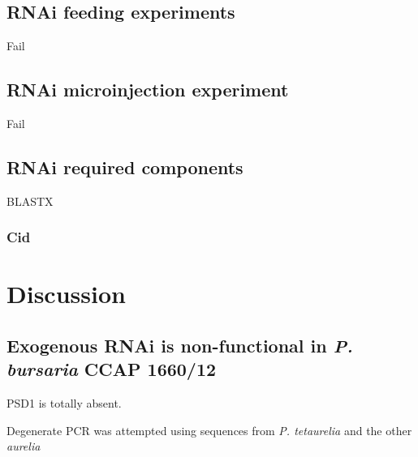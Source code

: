 \subsection{RNAi feeding experiments}

Fail

\subsection{RNAi microinjection experiment}

Fail

\subsection{RNAi required components}

BLASTX



\subsubsection{Cid}






\section{Discussion}

\subsection{Exogenous RNAi is non-functional in \textit{P. bursaria} CCAP 1660/12}

PSD1 is totally absent. 

Degenerate PCR was attempted using sequences from \textit{P. tetaurelia} and 
the other \textit{aurelia}




